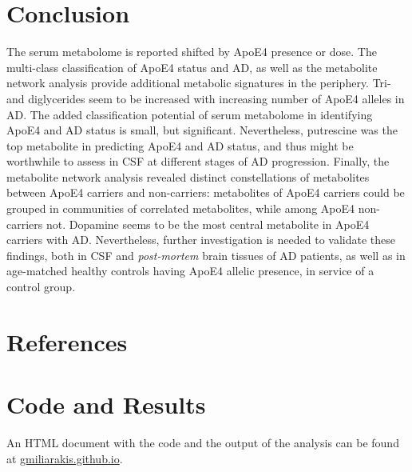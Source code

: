 \documentclass{amsart}
\begin{document}
\section{Conclusion} \label{concl}
The serum metabolome is reported shifted by ApoE4 presence or dose. The multi-class classification of ApoE4 status and AD, as well as the metabolite network analysis provide additional metabolic signatures in the periphery. Tri- and diglycerides seem to be increased with increasing number of ApoE4 alleles in AD. The added classification potential of serum metabolome in identifying ApoE4 and AD status is small, but significant. Nevertheless, putrescine was the top metabolite in predicting ApoE4 and AD status, and thus might be worthwhile to assess in CSF at different stages of AD progression. Finally, the metabolite network analysis revealed distinct constellations of metabolites between ApoE4 carriers and non-carriers: metabolites of ApoE4 carriers could be grouped in communities of correlated metabolites, while among ApoE4 non-carriers not. Dopamine seems to be the most central metabolite in ApoE4 carriers with AD. Nevertheless, further investigation is needed to validate these findings, both in CSF and \textit{post-mortem} brain tissues of AD patients, as well as in age-matched healthy controls having ApoE4 allelic presence, in service of a control group. 


\newpage
\section*{References}
\printbibliography[heading=none]
\clearpage
\appendix 
\clearpage
\section{Code and Results} \label{code}
An HTML document with the code and the output of the analysis can be found at \href{https://gmiliarakis.github.io}{gmiliarakis.github.io}.\\
\newline
\end{document}
